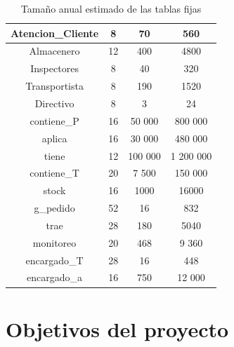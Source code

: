 \documentclass[10pt, a4paper,openany]{report}
\begin{document}
\begin{table}[h]
\begin{center}
\begin{tabular}[c]{|c|c|c|c|}
			\hline
			Atencion\_Cliente                              & 8   & 70        & 560         \\
			\hline
			Almacenero                                     & 12  & 400       & 4800        \\
			\hline
			Inspectores                                    & 8   & 40        & 320         \\
			\hline
			Transportista                                  & 8   & 190       & 1520        \\
			\hline
			Directivo                                      & 8   & 3         & 24          \\
			\hline
			contiene\_P                                    & 16  & 50 000    & 800 000     \\
			\hline
			aplica                                         & 16  & 30 000    & 480 000     \\
			\hline
			tiene                                          & 12  & 100 000   & 1 200 000   \\
			\hline
			contiene\_T                                    & 20  & 7 500     & 150 000     \\
			\hline
			stock                                          & 16  & 1000      & 16000       \\
			\hline
			g\_pedido                                      & 52  & 16        & 832         \\
			\hline
			trae                                           & 28  & 180       & 5040        \\
			\hline
			monitoreo                                      & 20  & 468       & 9 360       \\
			\hline
			encargado\_T                                   & 28  & 16        & 448         \\
			\hline
			encargado\_a                                   & 16  & 750       & 12 000      \\

			\hline
		\end{tabular}
	\end{center}
	\caption{Tamaño anual estimado de las tablas fijas}
\end{table}
\pagebreak



\section{Objetivos del proyecto}
\label{sec:Objetivos del proyecto}
\end{document}
